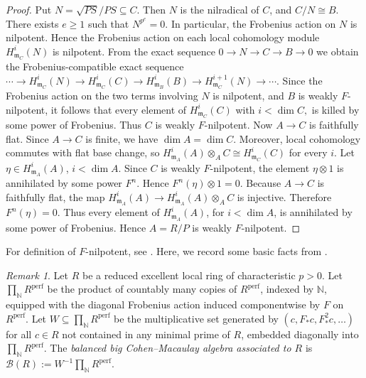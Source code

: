 \documentclass[10pt,a4paper]{amsart}
\theoremstyle{definition}
\theoremstyle{remark}
\newtheorem{remark}[theorem]{Remark}
\begin{document}
\begin{proof}
 Put
$
	N=\sqrt{PS}/PS\subseteq C.
	$ Then \(N\) is the nilradical of \(C\), and
$
	C/N\cong B.
$
There exists \(e\geq 1\) such that
$
	N^{p^e}=0.
	$	In particular, the Frobenius action on \(N\) is nilpotent. Hence the
	Frobenius action on each local cohomology module
	\(H^i_{\mathfrak m_C}(N)\) is nilpotent.
	From the exact sequence
$
	0\to N\to C\to B
	\to0
	$ we obtain the Frobenius-compatible exact sequence
 $
	\cdots\to
	H^i_{\mathfrak m_C}(N)
\to
	H^i_{\mathfrak m_C}(C)
\to
	H^i_{\mathfrak m_B}(B)
\to
	H^{i+1}_{\mathfrak m_C}(N)
\to\cdots .
	$ 
	Since the Frobenius action on the two terms involving \(N\) is
	nilpotent, and \(B\) is weakly \(F\)-nilpotent, it follows that
	every element of
$
	H^i_{\mathfrak m_C}(C)$ with $ i<\dim C,
$
	is killed by some power of Frobenius. Thus \(C\) is weakly
	\(F\)-nilpotent.
Now \(A\to C\) is faithfully flat. Since \(A\to C\) is finite,
	we have
$
	\dim A=\dim C.
$	Moreover, local cohomology commutes with flat base change, so
$
	H^i_{\mathfrak m_A}(A)\otimes_A C
	\cong
	H^i_{\mathfrak m_C}(C)
	$
for every \(i\). Let
$
	\eta\in H^i_{\mathfrak m_A}(A)$, $i<\dim A.
	$ Since \(C\) is weakly \(F\)-nilpotent, the element
	\(\eta\otimes1\) is annihilated by some power \(F^n\). Hence
$
	F^n(\eta)\otimes1=0.
$
Because \(A\to C\) is faithfully flat, the map
$
	H^i_{\mathfrak m_A}(A)
	\to
	H^i_{\mathfrak m_A}(A)\otimes_A C
	$ is injective. Therefore
$
	F^n(\eta)=0.
	$ Thus every element of \(H^i_{\mathfrak m_A}(A)\), for
	\(i<\dim A\), is annihilated by some power of Frobenius. Hence
	\(A=R/P\) is weakly \(F\)-nilpotent.
\end{proof}

 
For definition of \(F\)-nilpotent, see \cite[\S 12]{MP}.
Here, we record some basic facts from \cite{MP}.

\begin{remark} Let \(R\) be a reduced excellent local ring of characteristic \(p>0\). Let
	\(
	\prod_{\mathbb N}R^{\mathrm{perf}}
	\)
	be the product of countably many copies of \(R^{\mathrm{perf}}\), indexed by
	\(\mathbb N\), equipped with the diagonal Frobenius action induced componentwise
	by \(F\) on \(R^{\mathrm{perf}}\). Let
	\(
	W\subseteq \prod_{\mathbb N}R^{\mathrm{perf}}
	\)
	be the multiplicative set generated by
	\(
	(c,F_*c,F_*^2c,\dots)
	\)
	for all \(c\in R\) not contained in any minimal prime of \(R\), embedded
	diagonally into \(\prod_{\mathbb N}R^{\mathrm{perf}}\). The
	\emph{balanced big Cohen--Macaulay algebra associated to \(R\)} is
	\( 
	\mathcal B(R)
	:=
	W^{-1}\prod_{\mathbb N}R^{\mathrm{perf}}.
	\)

\end{remark}
\end{document}
